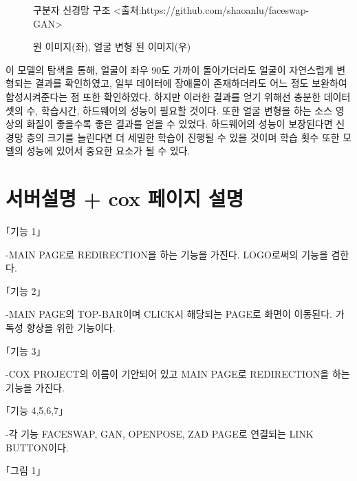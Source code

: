 \documentclass{oblivoir}
\begin{document}
\begin{figure}[h!]
    \centering
\caption{구분자 신경망 구조 <출처:https://github.com/shaoanlu/faceswap-GAN>}
\end{figure}

\begin{figure}[h!]
    \centering
\caption{원 이미지(좌), 얼굴 변형 된 이미지(우)}
\end{figure}


이 모델의 탐색을 통해, 얼굴이 좌우 90도 가까이 돌아가더라도 얼굴이 자연스럽게 변형되는 결과를 확인하였고, 일부 데이터에 장애물이 존재하더라도 어느 정도 보완하여 합성시켜준다는 점 또한 확인하였다. 하지만 이러한 결과를 얻기 위해선 충분한 데이터 셋의 수, 학습시간, 하드웨어의 성능이 필요할 것이다. 또한 얼굴 변형을 하는 소스 영상의 화질이 좋을수록 좋은 결과를 얻을 수 있었다. 하드웨어의 성능이 보장된다면 신경망 층의 크기를 늘린다면 더 세밀한 학습이 진행될 수 있을 것이며 학습 횟수 또한 모델의 성능에 있어서 중요한 요소가 될 수 있다.


\section{ 서버설명 + cox 페이지 설명}

\begin{figure}[h!]
    \centering
\end{figure}

\begin{figure}[h!]
    \centering
\end{figure}

｢기능 1｣

-MAIN PAGE로 REDIRECTION을 하는 기능을 가진다. LOGO로써의 기능을 겸한다.

｢기능 2｣

-MAIN PAGE의 TOP-BAR이며 CLICK시 해당되는 PAGE로 화면이 이동된다. 가독성 향상을 위한 기능이다.

｢기능 3｣

-COX PROJECT의 이름이 기안되어 있고 MAIN PAGE로 REDIRECTION을 하는 기능을 가진다.

｢기능 4,5,6,7｣

-각 기능 FACESWAP, GAN, OPENPOSE, ZAD PAGE로 연결되는 LINK BUTTON이다.

｢그림 1｣
\end{document}
